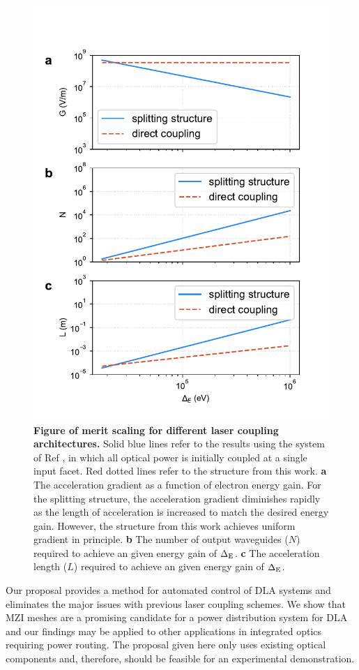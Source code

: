 \begin{figure}[!h]
\centering
\includegraphics[width=0.7\columnwidth]{figures/MZI_param}
\caption{\label{fig:plots} \textbf{Figure of merit scaling for different laser coupling architectures.} Solid blue lines refer to the results using the system of Ref \cite{hughes_-chip_2018}, in which all optical power is initially coupled at a single input facet. Red dotted lines refer to the structure from this work.  \textbf{a}  The acceleration gradient as a function of electron energy gain.  For the splitting structure, the acceleration gradient diminishes rapidly as the length of acceleration is increased to match the desired energy gain.  However, the structure from this work achieves uniform gradient in principle.  \textbf{b}  The number of output waveguides ($N$) required to achieve an given energy gain of $\Delta_\textrm{E}$.  \textbf{c}  The acceleration length ($L$) required to achieve an given energy gain of $\Delta_\textrm{E}$.}
\end{figure}


Our proposal provides a method for automated control of DLA systems and eliminates the major issues with previous laser coupling schemes.  We show that MZI meshes are a promising candidate for a power distribution system for DLA and our findings may be applied to other applications in integrated optics requiring power routing.  The proposal given here only uses existing optical components and, therefore, should be feasible for an experimental demonstration.

